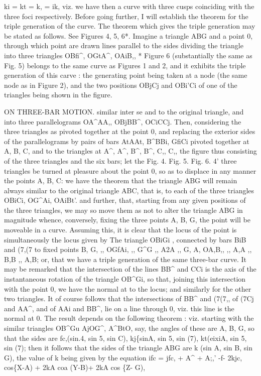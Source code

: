 \documentclass[12pt,a4paper]{article}
\begin{document}
ki = kt = k, = ik,
viz. we have
then a curve with
three cusps coinciding
with the three
foci respectively.
Before
going
further,
I
will
establish
the
theorem
for
the
triple
generation
of
the curve.
The
theorem
which
gives
the
triple
generation
may
be
stated
as
follows.
See
Figures
4,
5, 6*.
Imagine
a
triangle ABG and
a
point
0,
through
which
point
are
drawn
lines
parallel
to
the
sides
dividing
the
triangle
into
three
triangles
OBfi\textasciicircum{},
OGtA\textasciicircum{},
OAiB,,
*
Figure
6
(substantially
the
same
as
Fig.
5)
belongs
to
the
same
curve
as
Figures
1
and
2,
and
it
exhibits the
triple
generation
of
this
carve
:
the
generating
point
being
taken
at
a
node
(the same node
as in Figure
2), and the two positions OBjCj and OBi'Ci
of one of the triangles being shown
in the figure.

ON THREE-BAR MOTION.
similar
inter
se
and
to
the
original
triangle,
and
into
three
parallelograms
OA\textasciicircum{}AA,,
OBjBB\textasciicircum{},
OCiCCj.
Then,
considering
the
three
triangles
as
pivoted
together
at
the
point
0,
and
replacing
the
exterior
sides
of
the
parallelograms
by
pairs
of
bars
AtAAt, B\textasciicircum{}BBi, GfiCi pivoted
together at A, B,
C, and
to the
triangles at A\textasciicircum{}, A\textasciicircum{}, B\textasciicircum{}, B\textasciicircum{},
C,, C,,
the
figure
thus
consisting
of the
three
triangles
and
the
six
bars;
let
the
Fig.
4.
Fig.
5.
Fig.
6.
4'
three
triangles
be
turned
at
pleasure
about
the
point
0,
so
as
to
displace
in
any
manner
the
points A, B, C:
we
have
the
theorem that the triangle ABG will remain
always
similar
to
the
original
triangle ABC,
that
is,
to
each
of
the
three
triangles
OBiCi,
OG\textasciicircum{}Ai,
OAiBt'.
and
further,
that,
starting
from
any
given
positions
of
the
three
triangles, we may so move them as not to
alter the triangle ABG in magnitude
whence,
conversely,
fixing
the
three
points
A, B,
G,
the
point
will be moveable
in
a curve.
Assuming
this,
it
is
clear
that
the
locus
of
the
point
is
simultaneously
the
locus given by
The triangle
OBiGi
, connected
by bars BiB
and
(7,(7
to
fixed
points
B,
G,
,,
OGfAi,
,,
G\textasciicircum{}G
,,
A2A
,,
G,
A,
OA,B,,
,,
A,A
,,
B,B
,,
A,B;
or,
that
we
have
a
triple
generation
of
the
same
three-bar
curve.
It
may
be
remarked that the intersection
of the
lines BB\textasciicircum{} and CCi
is
the axis of the instantaneous
rotation
of the
triangle
OB\textasciicircum{}Gi,
so
that,
joining
this
intersection
with
the
point
0,
we
have
the
normal
at
to
the
locus;
and
similarly
for
the
other
two
triangles.
It
of course
follows
that
the
intersections
of BB\textasciicircum{}
and
(7(7,,
of
(7Cj and AA\textasciicircum{},
and
of
AAi and BB\textasciicircum{},
lie on a
line through
0,
viz.
this
line
is the normal at
0.
The
result
depends
on
the
following
theorem
:
viz.
starting
with
the
similar
triangles
OB\textasciicircum{}Gu
AjOG\textasciicircum{},
A\textasciicircum{}BtO,
say,
the
angles
of
these
are
A,
B,
G,
so
that
the
sides are
fc,(sin.4,
sin 5,
sin C), kj\{sinA, sin 5, sin (7), kt(eixiA, sin 5,
sin (7);
then
it
follows that the sides
of the
triangle ABG are
k (sin A, sin B,
sin G),
the
value
of k being given by
the equation
ifc\guillemotleft{} = jfc,\guillemotleft{} + A\textasciicircum{}\guillemotright{} + A;,' -f- 2kjc, cos\{X-A) + 2kA coa (Y-B)+ 2kA cos \{Z- G),
\end{document}
